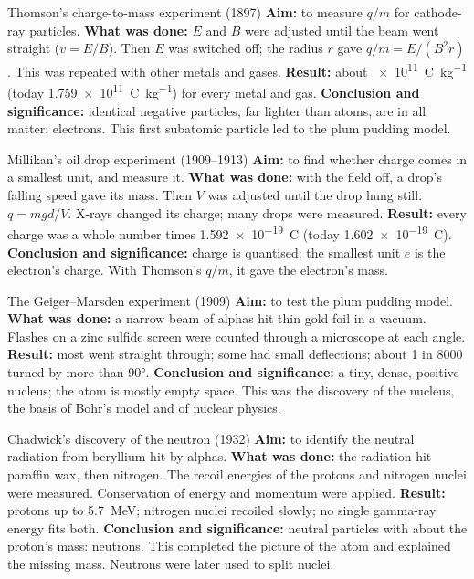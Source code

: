 \begin{experiment}[unbreakable]{Thomson's charge-to-mass experiment (1897)}
\textbf{Aim:} to measure $q/m$ for cathode-ray particles. \textbf{What was done:} $E$ and $B$
were adjusted until the beam went straight ($v = E/B$). Then $E$ was switched off; the radius
$r$ gave $q/m = E/(B^2 r)$. This was repeated with other metals and gases. \textbf{Result:}
about \qty{e11}{C.kg^{-1}} (today \qty{1.759e11}{C.kg^{-1}}) for every metal and gas.
\textbf{Conclusion and significance:} identical negative particles, far lighter than atoms, are
in all matter: electrons. This first subatomic particle led to the plum pudding model.
\end{experiment}

\begin{experiment}[unbreakable]{Millikan's oil drop experiment (1909--1913)}
\textbf{Aim:} to find whether charge comes in a smallest unit, and measure it. \textbf{What
was done:} with the field off, a drop's falling speed gave its mass. Then $V$ was adjusted
until the drop hung still: $q = mgd/V$. X-rays changed its charge; many drops were
measured. \textbf{Result:} every charge was a whole number times \qty{1.592e-19}{C} (today
\qty{1.602e-19}{C}). \textbf{Conclusion and significance:} charge is quantised; the smallest
unit $e$ is the electron's charge. With Thomson's $q/m$, it gave the electron's mass.
\end{experiment}

\begin{experiment}[unbreakable]{The Geiger--Marsden experiment (1909)}
\textbf{Aim:} to test the plum pudding model. \textbf{What was done:} a narrow beam of alphas
hit thin gold foil in a vacuum. Flashes on a zinc sulfide screen were counted through a
microscope at each angle. \textbf{Result:} most went straight through; some had small
deflections; about 1 in 8000 turned by more than \ang{90}. \textbf{Conclusion and
significance:} a tiny, dense, positive nucleus; the atom is mostly empty space. This was the
discovery of the nucleus, the basis of Bohr's model and of nuclear physics.
\end{experiment}

\begin{experiment}[unbreakable]{Chadwick's discovery of the neutron (1932)}
\textbf{Aim:} to identify the neutral radiation from beryllium hit by alphas. \textbf{What was
done:} the radiation hit paraffin wax, then nitrogen. The recoil energies of the protons and
nitrogen nuclei were measured. Conservation of energy and momentum were applied.
\textbf{Result:} protons up to \qty{5.7}{MeV}; nitrogen nuclei recoiled slowly; no single
gamma-ray energy fits both. \textbf{Conclusion and significance:} neutral particles with about
the proton's mass: neutrons. This completed the picture of the atom and explained the missing
mass. Neutrons were later used to split nuclei.
\end{experiment}

